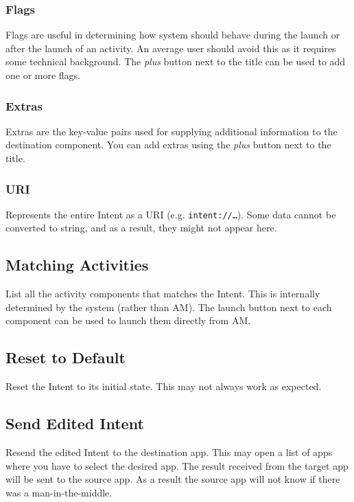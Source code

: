 \subsubsection{Flags} %
Flags are useful in determining how system should behave during the launch or after the launch of an activity. An
average user should avoid this as it requires some technical background. The \textit{plus} button next to the title can
be used to add one or more flags.

\subsubsection{Extras} %
Extras are the key-value pairs used for supplying additional information to the destination component. You can add
extras using the \textit{plus} button next to the title.

\subsubsection{URI} %
Represents the entire Intent as a URI (e.g. \texttt{intent://\dots}). Some data cannot be converted to string, and as a
result, they might not appear here.

\subsection{Matching Activities}\label{subsec:matching-activities} %
List all the activity components that matches the Intent. This is internally determined by the system (rather than AM).
The launch button next to each component can be used to launch them directly from AM\@.

\subsection{Reset to Default}\label{subsec:interceptor-reset-to-default} %
Reset the Intent to its initial state. This may not always work as expected.

\subsection{Send Edited Intent}\label{subsec:interceptor-send-edited-intent} %
Resend the edited Intent to the destination app. This may open a list of apps where you have to select the desired app.
The result received from the target app will be sent to the source app. As a result the source app will not know if
there was a man-in-the-middle.
